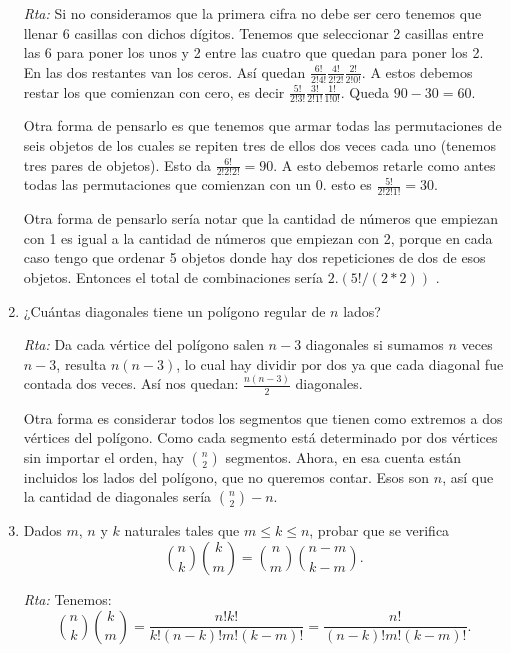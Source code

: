 \documentclass[a4paper,12pt,twoside,spanish,reqno]{amsbook}
\numberwithin{equation}{section}
\begin{document}
\begin{enumerate}
\noindent\textit{Rta:} Si no consideramos que la primera cifra no debe ser cero tenemos que llenar 6 casillas con dichos dígitos.
Tenemos que seleccionar 2 casillas entre las 6 para poner los unos y 2 entre las cuatro que quedan para poner los 2. En las dos restantes van los ceros. Así quedan $  \frac{6!}{2!4!}\frac{4!}{2!2!}\frac{2!}{2!0!}$. A estos debemos restar los que comienzan con cero, es decir $\frac{5!}{2!3!}\frac{3!}{2!1!}\frac{1!}{1!0!}$. Queda $90 -30=60$.

Otra forma de pensarlo es que tenemos que armar todas las permutaciones de seis objetos de los cuales se repiten tres de ellos dos veces cada uno (tenemos tres pares de objetos). Esto da $\frac{6!}{2!2!2!}=90$. A esto debemos retarle como antes todas las permutaciones que comienzan con un 0. esto es $\frac{5!}{2!2!1!}=30$.

Otra forma de pensarlo sería notar que la cantidad de números que empiezan con 1 es igual a la cantidad de números que empiezan con 2, porque en cada caso tengo que ordenar 5 objetos donde hay dos repeticiones de dos de esos objetos. Entonces el total de combinaciones sería $2.(5!/(2*2))$ .

\medskip

\item ¿Cuántas diagonales tiene un polígono regular de $n$ lados?

\noindent\textit{Rta:} Da cada vértice del polígono salen $n-3$ diagonales si sumamos $n$ veces $n-3$, resulta $n(n-3)$,  lo cual hay dividir por dos ya que cada diagonal fue contada dos veces. Así nos quedan: $ \frac{n(n-3)}{2}$ diagonales.

Otra forma es considerar todos los segmentos que tienen como extremos a dos vértices del polígono. Como cada segmento está determinado por dos vértices sin importar el orden, hay $\binom{n}{2}$ segmentos. Ahora, en esa cuenta están incluidos los lados del polígono, que no queremos contar. Esos son $n$, así que la cantidad de diagonales sería $\binom{n}{2}-n$.

\medskip

\item Dados $m$, $n$ y $k$ naturales tales que $m \le k \le n$, probar que se verifica
\begin{equation*}
\binom{n}{k}\binom{k}{m} = \binom{n}{m}\binom{n-m}{k-m}.
\end{equation*}

\noindent\textit{Rta:} Tenemos: $$\binom{n}{k}\binom{k}{m}=\frac{n!k!}{k!(n-k)!m!(k-m)!}=\frac{n!}{(n-k)!m!(k-m)!}.$$


\end{enumerate}
\end{document}
